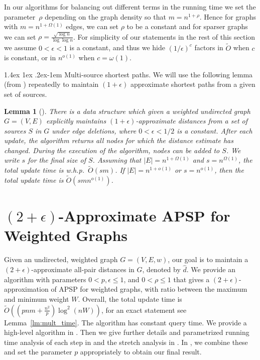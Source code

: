 \documentclass[11pt]{article}
\makeatletter
\newtheorem{lemma}[theorem]{Lemma}
\theoremstyle{definition}
\theoremstyle{remark}
\renewcommand{\paragraph}{%
  \@startsection{paragraph}{4}%
  {\z@}{1.4ex \@plus 1ex \@minus .2ex}{-1em}%
  {\normalfont\normalsize\bfseries}%
}
\makeatother
\begin{document}
\begin{titlepage}
In our algorithms for balancing out different terms in the running time we set the parameter~$\rho$ depending on the graph density so that $m= n^{1+\rho}$. Hence for graphs with $m= n^{1+\Omega(1)}$ edges, we can set $\rho$ to be a constant and for sparser graphs we can set $\rho = \frac{\sqrt{\log n}}{\log \log n}$. For simplicity of our statements in the rest of this section we assume $0< \epsilon <1$ is a constant, and thus we hide $(1/\epsilon)^c$ factors in $\tilde{O}$ when $c$ is constant, or in $n^{o(1)}$ when $c=\omega(1)$.



\paragraph{Multi-source shortest paths.}
We will use the following lemma (from \cite{LN2020}) repeatedly to maintain $(1+\epsilon)$ approximate shortest paths from a given set of sources. 

\begin{lemma}[\cite{LN2020}]\label{lm:decr_MSSP}
    There is a data structure which given a weighted undirected graph $G = (V, E)$ explicitly maintains $(1+\epsilon)$-approximate distances from a set of sources $S$ in $G$ under edge deletions, where $0<\epsilon< 1/2$ is a constant. After each update, the algorithm returns all nodes for which the distance estimate has changed. 
    During the execution of the algorithm, nodes can be added to $S$. We write $s$ for the final size of $S$. 
    Assuming that $|E| = n^{1+\Omega(1)}$ and $s = n^{\Omega(1)}$, the total update time is w.h.p.~$\tilde O(sm)$. If $|E| = n^{1+o(1)}$ or $s= n^{o(1)}$, then the total update time is $\tilde O(smn^{o(1)})$. 
\end{lemma}


\section{\texorpdfstring{$(2+\epsilon)$}{(2+epsilon)}-Approximate APSP for Weighted Graphs}\label{sec:TZ_2+eps}
Given an undirected, weighted graph $G=(V,E,w)$, our goal is to maintain a $(2+\epsilon)$-approximate all-pair distances in $G$, denoted by $\hat{d}$. 
We provide an algorithm \DynAPSPtwo with parameters $ 0< p,\epsilon\leq 1 $, and $0< \rho \leq 1$ that gives a $(2+\epsilon)$-approximation of APSP for weighted graphs, with ratio between the maximum and minimum weight $W$. Overall, the total update time is $\tilde{O}((pnm + \tfrac{n^2}{p}) \log^2 (nW))$, for an exact statement see Lemma~\ref{lm:mult_time}. The algorithm has constant query time. We provide a high-level algorithm in . Then we give further details and parametrized running time analysis of each step in  and the stretch analysis in . In , we combine these and set the parameter $p$ appropriately to obtain our final result. 
 



\end{titlepage}
\end{document}
